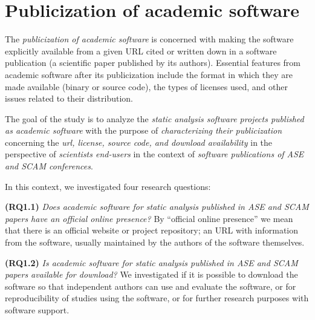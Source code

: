 \section{Publicization of academic software}
\label{study1}

The \textit{publicization of academic software} is concerned with making
the software explicitly available from a given URL cited or written down in a software
publication (a scientific paper published by its authors). 
Essential features from academic software after its publicization include the format in
which they are made available (binary or source code), the types of licenses
used, and other issues related to their distribution.

%
The goal of the study is to
analyze the {\it static analysis software projects published as academic software}
with the purpose of \textit{characterizing their publicization}
concerning the \textit{url, license, source code, and download availability} in
the perspective of \textit{scientists end-users} in the context of
\textit{software publications of ASE and SCAM conferences}.


In this context, we investigated four research questions:

\newcommand{\StudyOneQuestionOne}{
	\textbf{(RQ1.1)} \textit{Does academic software for static analysis published in ASE and SCAM
papers have an official online presence?}
}
\newcommand{\StudyOneQuestionTwo}{
	\textbf{(RQ1.2)} \textit{Is academic software for static analysis published in ASE and SCAM
papers available for download?}
}
\newcommand{\StudyOneQuestionThree}{
	\textbf{(RQ1.3)} \textit{Is the source code of academic software for static analysis published
in ASE and SCAM papers available?}
}	
\newcommand{\StudyOneQuestionFour}{
	\textbf{(RQ1.4)} \textit{Does academic software for static analysis published in ASE and SCAM
papers with source code available provide a free software license?}
}

\noindent \StudyOneQuestionOne By ``official online presence'' we mean
that there is an official website or project repository; an URL with
information from the software, usually maintained by the authors of the
software themselves.

\noindent \StudyOneQuestionTwo We investigated if it is possible to
download the software so that independent authors can use and
evaluate the software, or for reproducibility of studies using the software, or
for further research purposes with software support.

